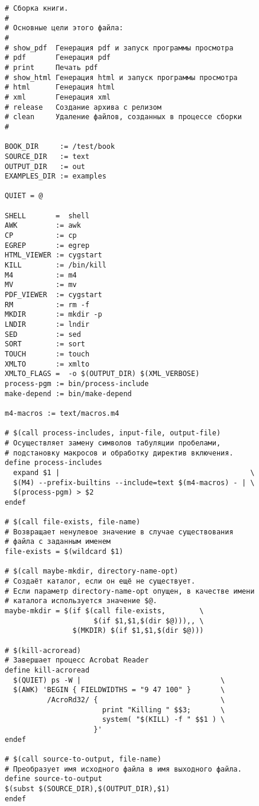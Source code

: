 \begin{verbatim}
# Сборка книги.
#
# Основные цели этого файла:
#
# show_pdf  Генерация pdf и запуск программы просмотра
# pdf       Генерация pdf
# print     Печать pdf
# show_html Генерация html и запуск программы просмотра
# html      Генерация html
# xml       Генерация xml
# release   Создание архива с релизом
# clean     Удаление файлов, созданных в процессе сборки
#

BOOK_DIR     := /test/book
SOURCE_DIR   := text
OUTPUT_DIR   := out
EXAMPLES_DIR := examples

QUIET = @

SHELL       =  shell
AWK         := awk
CP          := cp
EGREP       := egrep
HTML_VIEWER := cygstart
KILL        := /bin/kill
M4          := m4
MV          := mv
PDF_VIEWER  := cygstart
RM          := rm -f
MKDIR       := mkdir -p
LNDIR       := lndir
SED         := sed
SORT        := sort
TOUCH       := touch
XMLTO       := xmlto
XMLTO_FLAGS =  -o $(OUTPUT_DIR) $(XML_VERBOSE)
process-pgm := bin/process-include
make-depend := bin/make-depend

m4-macros := text/macros.m4

# $(call process-includes, input-file, output-file)
# Осуществляет замену символов табуляции пробелами,
# подстановку макросов и обработку директив включения.
define process-includes
  expand $1 |                                             \
  $(M4) --prefix-builtins --include=text $(m4-macros) - | \
  $(process-pgm) > $2
endef

# $(call file-exists, file-name)
# Возвращает ненулевое значение в случае существования
# файла с заданным именем
file-exists = $(wildcard $1)

# $(call maybe-mkdir, directory-name-opt)
# Создаёт каталог, если он ещё не существует.
# Если параметр directory-name-opt опущен, в качестве имени
# каталога используется значение $@.
maybe-mkdir = $(if $(call file-exists,        \
                     $(if $1,$1,$(dir $@))),, \
                $(MKDIR) $(if $1,$1,$(dir $@)))

# $(kill-acroread)
# Завершает процесс Acrobat Reader
define kill-acroread
  $(QUIET) ps -W |                                 \
  $(AWK) 'BEGIN { FIELDWIDTHS = "9 47 100" }       \
          /AcroRd32/ {                             \
                       print "Killing " $$3;       \
                       system( "$(KILL) -f " $$1 ) \
                     }'
endef

# $(call source-to-output, file-name)
# Преобразует имя исходного файла в имя выходного файла.
define source-to-output
$(subst $(SOURCE_DIR),$(OUTPUT_DIR),$1)
endef


\end{verbatim}
